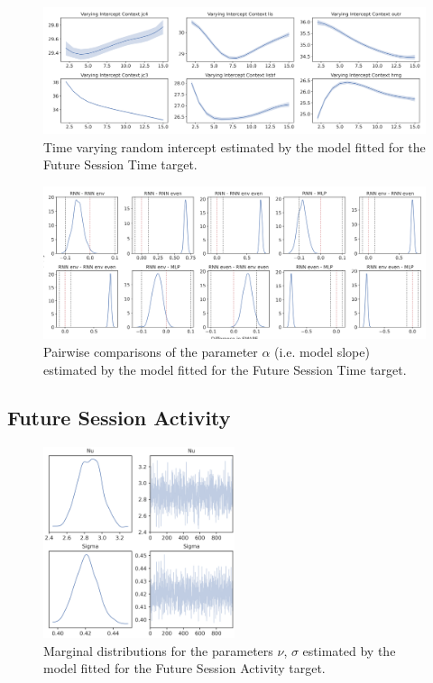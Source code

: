 \begin{figure}[ht]
\centering
\includegraphics[width=\textwidth]{images/appendix_C/Future Session Time_interc_3.png}
\caption[\textbf{Future session time time-varying random intercept}]{Time varying random intercept estimated by the model fitted for the Future Session Time target.}
\label{interc_sess_3}
\end{figure} \FloatBarrier

\begin{figure}[ht]
\centering
\includegraphics[width=\textwidth]{images/appendix_C/Future_Session_Time_comp_3.png}
\caption[\textbf{Future session time pairwise comparisons of model fixed effect}]{Pairwise comparisons of the parameter $\alpha$ (i.e. model slope) estimated by the model fitted for the Future Session Time target.}
\label{comp_sess_3}
\end{figure} \FloatBarrier

\subsection{Future Session Activity}
\label{future_acti_bayes_3}

\begin{figure}[ht]
\centering
\includegraphics[width=0.5\textwidth]{images/appendix_C/Future Session Activity_marginals_3.png}
\caption[\textbf{Future session activity marginal distributions}]{Marginal distributions for the parameters $\nu$, $\sigma$ estimated by the model fitted for the Future Session Activity target.}
\label{marginals_acti_3}
\end{figure} \FloatBarrier

